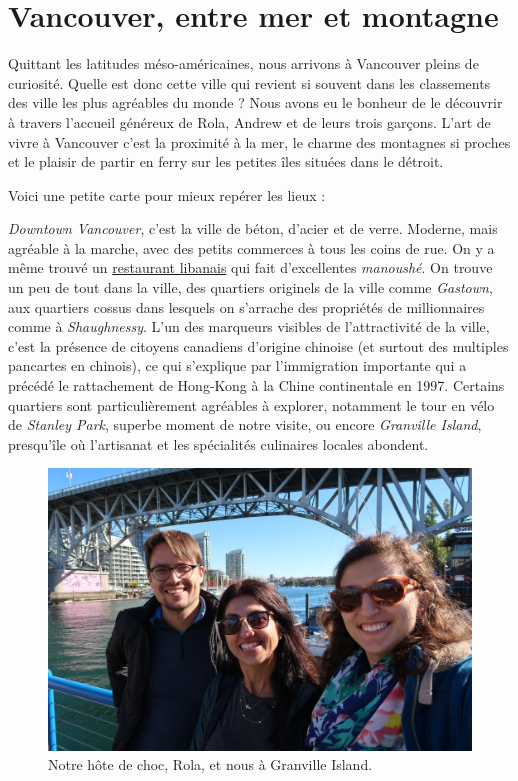 \hypertarget{vancouver-entre-mer-et-montagne}{%
\section{Vancouver, entre mer et
montagne}\label{vancouver-entre-mer-et-montagne}}

Quittant les latitudes méso-américaines, nous arrivons à Vancouver
pleins de curiosité. Quelle est donc cette ville qui revient si souvent
dans les classements des ville les plus agréables du monde ? Nous avons
eu le bonheur de le découvrir à travers l'accueil généreux de Rola,
Andrew et de leurs trois garçons. L'art de vivre à Vancouver c'est la
proximité à la mer, le charme des montagnes si proches et le plaisir de
partir en ferry sur les petites îles situées dans le détroit.

Voici une petite carte pour mieux repérer les lieux :

\hypertarget{mapid}{}

\emph{Downtown Vancouver}, c'est la ville de béton, d'acier et de verre.
Moderne, mais agréable à la marche, avec des petits commerces à tous les
coins de rue. On y a même trouvé un
\href{/manger-au-liban.html}{restaurant libanais} qui fait d'excellentes
\emph{manoushé}. On trouve un peu de tout dans la ville, des quartiers
originels de la ville comme \emph{Gastown}, aux quartiers cossus dans
lesquels on s'arrache des propriétés de millionnaires comme à
\emph{Shaughnessy}. L'un des marqueurs visibles de l'attractivité de la
ville, c'est la présence de citoyens canadiens d'origine chinoise (et
surtout des multiples pancartes en chinois), ce qui s'explique par
l'immigration importante qui a précédé le rattachement de Hong-Kong à la
Chine continentale en 1997. Certains quartiers sont particulièrement
agréables à explorer, notamment le tour en vélo de \emph{Stanley Park},
superbe moment de notre visite, ou encore \emph{Granville Island},
presqu'île où l'artisanat et les spécialités culinaires locales
abondent.

\begin{figure}
\centering
\includegraphics{images/20181016_granville.JPG}
\caption{Notre hôte de choc, Rola, et nous à Granville Island.}
\end{figure}

